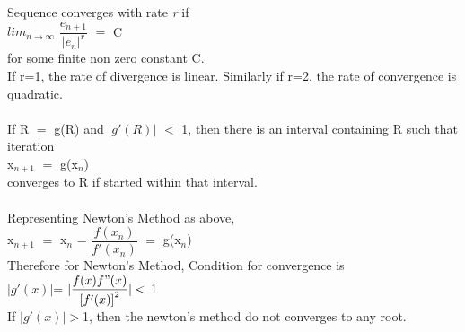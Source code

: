 \documentclass[15pt]{report}
\begin{document}
Sequence converges with rate \textit{r} if\\
$lim_{n\rightarrow \infty}$ $\dfrac{e_{n+1}}{{\vert e_{n} \vert}^r}$ $=$ C \\for some finite non zero constant C. \\
If r=1, the rate of divergence is linear. Similarly if r=2, the rate of convergence is quadratic.\\ \\
If R $=$ g(R) and $\vert g'(R) \vert$ $<$ 1, then there is an interval containing R such that iteration \\
\hspace*{40mm} x$_{n+1}$ $=$ g(x$_{n}$)\\
converges to R if started within that interval.\\ \\
Representing Newton's Method as above,\\
\hspace*{30mm}x$_{n+1}$ $=$ x$_{n}$ $-$ $\dfrac{f(x_{n})}{f'(x_{n})}$ $=$ g(x$_{n}$)\\
Therefore for Newton's Method, Condition for convergence is\\  
\hspace*{40mm} $\vert g'(x) \vert$= $\vert\dfrac{f(x)f"(x)}{{[f'(x)]}^2  }\vert <$  1\\
If $\vert g'(x) \vert > $1, then  the newton's method do not converges to any root.\\
\end{document}

